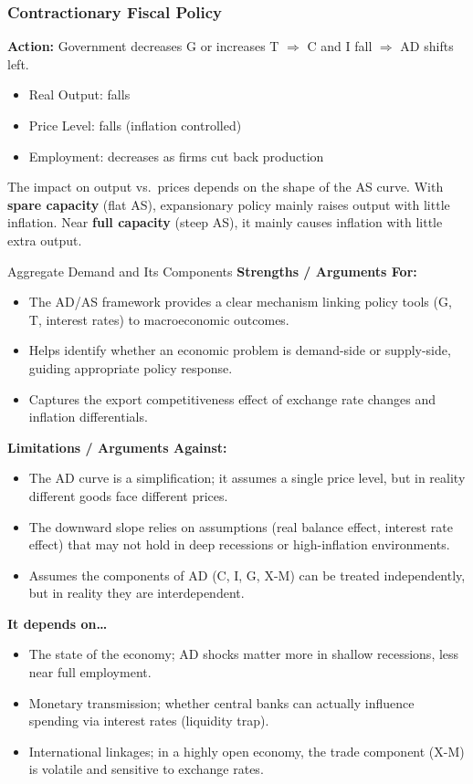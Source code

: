 \documentclass[11pt, a4paper, twoside]{book}
\begin{document}
\subsubsection{Contractionary Fiscal Policy}

\textbf{Action:} Government decreases G or increases T $\Rightarrow$ C and I fall $\Rightarrow$ AD shifts left.

\begin{itemize}
  \item Real Output: falls
  \item Price Level: falls (inflation controlled)
  \item Employment: decreases as firms cut back production
\end{itemize}

\begin{coreidea}
The impact on output vs.\ prices depends on the shape of the AS curve. With \textbf{spare capacity} (flat AS), expansionary policy mainly raises output with little inflation. Near \textbf{full capacity} (steep AS), it mainly causes inflation with little extra output.
\end{coreidea}

\begin{evaluation}{Aggregate Demand and Its Components}
\textbf{Strengths / Arguments For:}
\begin{itemize}[leftmargin=*, nosep]
\item The AD/AS framework provides a clear mechanism linking policy tools (G, T, interest rates) to macroeconomic outcomes.
\item Helps identify whether an economic problem is demand-side or supply-side, guiding appropriate policy response.
\item Captures the export competitiveness effect of exchange rate changes and inflation differentials.
\end{itemize}
\textbf{Limitations / Arguments Against:}
\begin{itemize}[leftmargin=*, nosep]
\item The AD curve is a simplification; it assumes a single price level, but in reality different goods face different prices.
\item The downward slope relies on assumptions (real balance effect, interest rate effect) that may not hold in deep recessions or high-inflation environments.
\item Assumes the components of AD (C, I, G, X-M) can be treated independently, but in reality they are interdependent.
\end{itemize}
\textbf{It depends on\ldots}
\begin{itemize}[leftmargin=*, nosep]
\item The state of the economy; AD shocks matter more in shallow recessions, less near full employment.
\item Monetary transmission; whether central banks can actually influence spending via interest rates (liquidity trap).
\item International linkages; in a highly open economy, the trade component (X-M) is volatile and sensitive to exchange rates.
\end{itemize}
\end{evaluation}
\end{document}
